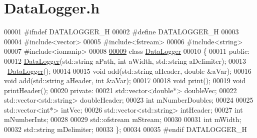 \hypertarget{_data_logger_8h_source}{}\section{Data\+Logger.\+h}
\label{_data_logger_8h_source}

\begin{DoxyCode}
00001 \textcolor{preprocessor}{#ifndef DATALOGGER\_H}
00002 \textcolor{preprocessor}{#define DATALOGGER\_H}
00003 
00004 \textcolor{preprocessor}{#include<vector>}
00005 \textcolor{preprocessor}{#include<fstream>}
00006 \textcolor{preprocessor}{#include<string>}
00007 \textcolor{preprocessor}{#include<iomanip>}
00008 
\hyperlink{class_data_logger}{00009} \textcolor{keyword}{class }\hyperlink{class_data_logger}{DataLogger}
00010 \{
00011 \textcolor{keyword}{public}:
00012     \hyperlink{class_data_logger}{DataLogger}(std::string aPath, \textcolor{keywordtype}{int} aWidth, std::string aDelimiter);
00013     ~\hyperlink{class_data_logger}{DataLogger}();
00014 
00015     \textcolor{keywordtype}{void} add(std::string aHeader, \textcolor{keywordtype}{double} &aVar);
00016     \textcolor{keywordtype}{void} add(std::string aHeader, \textcolor{keywordtype}{int} &aVar);   
00017 
00018     \textcolor{keywordtype}{void} print();
00019     \textcolor{keywordtype}{void} printHeader();
00020 \textcolor{keyword}{private}:
00021     std::vector<double*> doubleVec;
00022     std::vector<std::string> doubleHeader;
00023     \textcolor{keywordtype}{int} mNumberDoubles;
00024 
00025     std::vector<int*> intVec;
00026     std::vector<std::string> intHeader;
00027     \textcolor{keywordtype}{int} mNumberInts;
00028 
00029     std::ofstream mStream;
00030 
00031     \textcolor{keywordtype}{int} mWidth;
00032     std::string mDelimiter;
00033 \};
00034 
00035 \textcolor{preprocessor}{#endif DATALOGGER\_H}
\end{DoxyCode}

